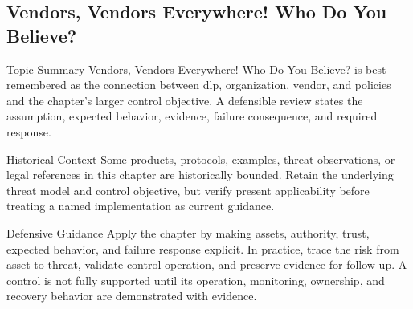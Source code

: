 \documentclass[11pt,letterpaper]{article}
\begin{document}
\subsection*{Vendors, Vendors Everywhere! Who Do You Believe?}
\begin{CornellNotesTable}
\end{CornellNotesTable}
\begin{CornellSummaryBox}{Topic Summary}
Vendors, Vendors Everywhere! Who Do You Believe? is best remembered as the connection between dlp, organization, vendor, and policies and the chapter's larger control objective. A defensible review states the assumption, expected behavior, evidence, failure consequence, and required response.
\end{CornellSummaryBox}
\begin{CornellWarningBox}{Historical Context}
Some products, protocols, examples, threat observations, or legal references in this chapter are historically bounded. Retain the underlying threat model and control objective, but verify present applicability before treating a named implementation as current guidance.
\end{CornellWarningBox}
\begin{CornellOverviewBox}{Defensive Guidance}
Apply the chapter by making assets, authority, trust, expected behavior, and failure response explicit. In practice, trace the risk from asset to threat, validate control operation, and preserve evidence for follow-up. A control is not fully supported until its operation, monitoring, ownership, and recovery behavior are demonstrated with evidence.
\end{CornellOverviewBox}
\end{document}

